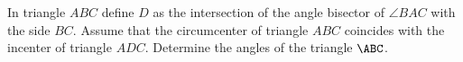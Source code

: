 In triangle $ABC$ define $D$ as the intersection of the angle bisector of $\angle BAC$
with the side $BC$. Assume that the circumcenter of triangle $ABC$ coincides with the
incenter of triangle $ADC$. Determine the angles of the triangle $\ABC$.